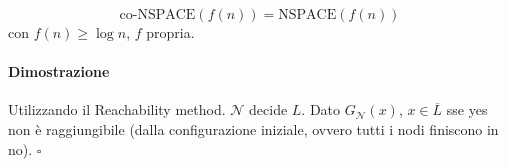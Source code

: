 \begin{corollary}
    $$
        \text{co-NSPACE}(f(n)) = \text{NSPACE}(f(n))
    $$
    con $f(n)\geq\log n$, $f$ propria.
\end{corollary}
\paragraph{Dimostrazione} Utilizzando il Reachability method. $\mathcal{N}$ decide $L$. Dato $G_\mathcal{N}(x)$, $x\in\overline{L}$ sse yes non è raggiungibile (dalla configurazione iniziale, ovvero tutti i nodi finiscono in no). \hfill$\square$






